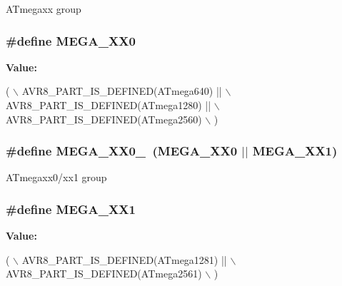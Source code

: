 A\-Tmegaxx group \hypertarget{group__mega__part__macros__group_gad59dc6f3c3dc91c94cd1673448135b83}{
\subsubsection[{M\-E\-G\-A\-\_\-\-X\-X0}]{\setlength{\rightskip}{0pt plus 5cm}\#define M\-E\-G\-A\-\_\-\-X\-X0}}\label{group__mega__part__macros__group_gad59dc6f3c3dc91c94cd1673448135b83}
{\bfseries Value\-:}
\begin{DoxyCode}
( \(\backslash\)
        AVR8\_PART\_IS\_DEFINED(ATmega640)  || \(\backslash\)
        AVR8\_PART\_IS\_DEFINED(ATmega1280) || \(\backslash\)
        AVR8\_PART\_IS\_DEFINED(ATmega2560) \(\backslash\)
        )
\end{DoxyCode}
\hypertarget{group__mega__part__macros__group_ga59ba73abcf65d3d398e7d37d78c271fe}{
\subsubsection[{M\-E\-G\-A\-\_\-\-X\-X0\-\_\-1}]{\setlength{\rightskip}{0pt plus 5cm}\#define M\-E\-G\-A\-\_\-\-X\-X0\-\_~({\bf M\-E\-G\-A\-\_\-\-X\-X0} $|$$|$ {\bf M\-E\-G\-A\-\_\-\-X\-X1})}}\label{group__mega__part__macros__group_ga59ba73abcf65d3d398e7d37d78c271fe}
A\-Tmegaxx0/xx1 group \hypertarget{group__mega__part__macros__group_ga9ed7e955cff24655d99517f91d9f6392}{
\subsubsection[{M\-E\-G\-A\-\_\-\-X\-X1}]{\setlength{\rightskip}{0pt plus 5cm}\#define M\-E\-G\-A\-\_\-\-X\-X1}}\label{group__mega__part__macros__group_ga9ed7e955cff24655d99517f91d9f6392}
{\bfseries Value\-:}
\begin{DoxyCode}
( \(\backslash\)
        AVR8\_PART\_IS\_DEFINED(ATmega1281) || \(\backslash\)
        AVR8\_PART\_IS\_DEFINED(ATmega2561) \(\backslash\)
        )
\end{DoxyCode}
